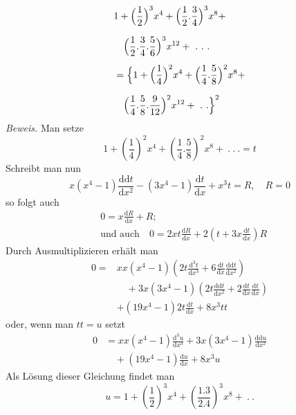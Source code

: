 \begingroup
\renewcommand{\arraystretch}{1.45}
\[
\begin{aligned}
&1+\Bigl(\frac12\Bigr)^3x^4+\Bigl(\frac12.\frac34\Bigr)^3x^8+
\\[7pt]&\quad{}\Bigl(\frac12.\frac34.\frac56\Bigr)^3x^{12}+\ .\ .\ .\\[5pt]
&=\Bigl\{1+\Bigl(\frac14\Bigr)^2x^4+\Bigl(\frac14.\frac58\Bigr)^2x^8+
\\[7pt]&\quad{}\Bigl(\frac14.\frac58.\frac9{12}\Bigr)^2x^{12}+\ .\ .\Bigr\}^2
\end{aligned}
\]
\textit{Beweis.} Man setze
\[
1+\left(\frac14\right)^2x^4+\left(\frac14.\frac58\right)^2x^8+\ .\ .\ .=t
\]
Schreibt man nun
\[
x(x^4-1)\frac{\mathrm{dd}t}{\mathrm dx^2}-(3x^4-1)\frac{\mathrm dt}{\mathrm dx}+x^3t=R,\quad R=0
\]
so folgt auch
\[
\begin{aligned}&0=x\frac{\mathrm dR}{\mathrm dx}+R;\\[7pt]&\text{und auch}\quad
0=2xt\frac{\mathrm dR}{\mathrm dx}+2\left(t+3x\frac{\mathrm dt}{\mathrm dx}\right)R\end{aligned}
\]
Durch Ausmultiplizieren erhält man
\[
\begin{aligned}
0={}&xx(x^4-1)\left(2t\frac{\mathrm d^3t}{\mathrm dx^3}+6\frac{\mathrm dt}{\mathrm dx}\frac{\mathrm{dd}t}{\mathrm dx^2}\right)
\\[7pt]&\quad{}+3x(3x^4-1)\left(2t\frac{\mathrm{dd}t}{\mathrm dx^2}+2\frac{\mathrm dt}{\mathrm dx}\frac{\mathrm dt}{\mathrm dx}\right)\\[5pt]
&+(19x^4-1)2t\frac{\mathrm dt}{\mathrm dx}+8x^3tt
\end{aligned}
\]
oder, wenn man $tt=u$ setzt
\[
\begin{aligned}0&=xx(x^4-1)\frac{\mathrm d^3u}{\mathrm dx^3}+3x(3x^4-1)\frac{\mathrm{dd}u}{\mathrm dx^2}
\\[7pt]&\quad{}+(19x^4-1)\frac{\mathrm du}{\mathrm dx}+8x^3u\end{aligned}
\]
Als Lösung dieser Gleichung findet man
\[
u=1+\left(\frac12\right)^3x^4+\left(\frac{1.3}{2.4}\right)^3x^8+\ .\ .
\]


